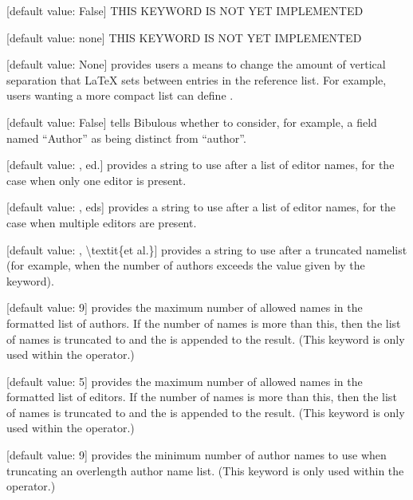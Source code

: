 \documentclass[letterpaper,10pt,english]{sphinxmanual}
\begin{document}
 {[}default value: False{]} THIS KEYWORD IS NOT YET IMPLEMENTED

 {[}default value: none{]} THIS KEYWORD IS NOT YET IMPLEMENTED

 {[}default value: None{]} provides users a means to change the amount of vertical separation that LaTeX sets between entries in the reference list. For example, users wanting a more compact list can define .

 {[}default value: False{]} tells Bibulous whether to consider, for example, a field named “Author” as being distinct from “author”.

 {[}default value: , ed.{]} provides a string to use after a list of editor names, for the case when only one editor is present.

 {[}default value: , eds{]} provides a string to use after a list of editor names, for the case when multiple editors are present.

 {[}default value: , \textbackslash{}textit\{et al.\}{]} provides a string to use after a truncated namelist (for example, when the number of authors exceeds the value given by the  keyword).

 {[}default value: 9{]} provides the maximum number of allowed names in the formatted list of authors. If the number of names is more than this, then the list of names is truncated to  and the  is appended to the result. (This keyword is only used within the  operator.)

 {[}default value: 5{]} provides the maximum number of allowed names in the formatted list of editors. If the number of names is more than this, then the list of names is truncated to  and the  is appended to the result. (This keyword is only used within the  operator.)

 {[}default value: 9{]} provides the minimum number of author names to use when truncating an overlength author name list. (This keyword is only used within the  operator.)
\end{document}
